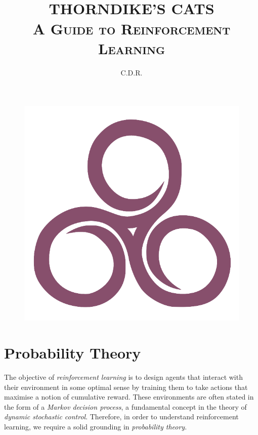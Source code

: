 \documentclass[a4paper,11pt,oneside]{book}
\title{
	     \HRule{1pt} \\ [0.2cm] %
	     \LARGE \textbf{\uppercase{Thorndike's Cats}} %
	     \HRule{1pt} \\ [0.5cm] %
	     \normalsize \textsc{A Guide to Reinforcement Learning} \\ [3cm] %
}
\author{C.D.R.\\}
\makeatletter
\def\printtitle{{\centering \@title\par}}
\def\printauthor{{\centering \large \@author}}
\theoremstyle{plain}
\theoremstyle{definition}
\makeatother
\begin{document}
\thispagestyle{empty} %
\pagecolor{bblue}\afterpage{\nopagecolor}

\printtitle %
\begin{figure}[hbtp]
\centering
\includegraphics[scale=0.4]{illusion.png}
\end{figure}
\vfill
\printauthor %
\newpage
\tableofcontents
\thispagestyle{empty}
\pagebreak
\setcounter{page}{1}
\chapter{Probability Theory}
The objective of \emph{reinforcement learning} is to design agents that interact with their environment in some optimal sense by training them to take actions that maximise a notion of cumulative reward. These environments are often stated in the form of a \emph{Markov decision process}, a fundamental concept in the theory of \emph{dynamic stochastic control}. Therefore, in order to understand reinforcement learning, we require a solid grounding in \emph{probability theory}.
\end{document}
